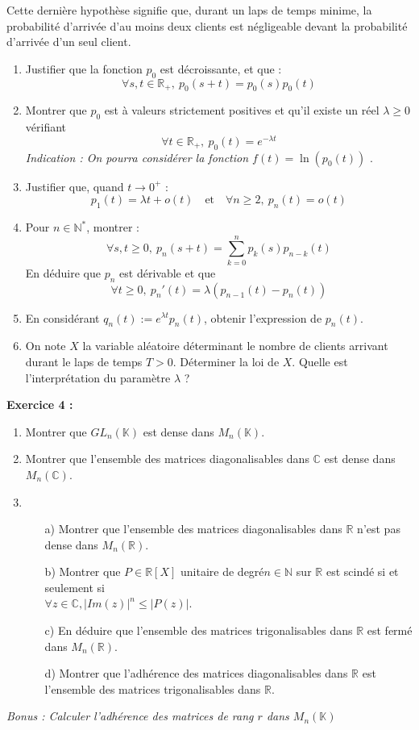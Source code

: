 \documentclass[11pt,a4paper]{article}
\begin{document}
Cette dernière hypothèse signifie que, durant un laps de temps minime, la probabilité d'arrivée d'au moins deux clients est négligeable devant la probabilité d'arrivée d'un seul client.

\begin{enumerate}
\item Justifier que la fonction $p_0$ est décroissante, et que : \[\forall s,t \in \mathbb{R}_+, \ p_0(s+t)=p_0(s)p_0(t)\]
\item Montrer que $p_0$ est à valeurs strictement positives et qu'il existe un réel $\lambda \geq 0$ vérifiant \[\forall t \in \mathbb{R}_+, \ p_0(t) = e^{-\lambda t}\]
\textit{Indication : On pourra considérer la fonction $f(t) = \ln{(p_0(t))}$ }.
\item Justifier que, quand  $t \to 0^+$ : \[p_1(t) = \lambda t + o(t) \ \ \  \text{ et } \ \ \ \forall n \geq 2, \ p_n(t) = o(t)\]
\item Pour $n\in \mathbb{N}^*$, montrer : \[\forall s,t \geq 0, \  p_n(s+t)= \sum_{k=0}^np_k(s)p_{n-k}(t)\] En déduire que $p_n$ est dérivable et que \[\forall t \geq 0, \ p_n'(t)=\lambda(p_{n-1}(t) - p_n(t))\]
\item En considérant $q_n(t) := e^{\lambda t} p_n(t)$, obtenir l'expression de $p_n(t)$.
\item On note $X$ la variable aléatoire déterminant le nombre de clients arrivant durant le laps de temps $T >0$. Déterminer la loi de $X$. Quelle est l'interprétation du paramètre $\lambda$ ? \\
\end{enumerate}

\textbf{Exercice 4 :}
\begin{enumerate}
\item Montrer que $GL_n(\mathbb{K})$ est dense dans $M_n(\mathbb{K})$.
\item Montrer que l'ensemble des matrices diagonalisables dans $\mathbb{C}$ est dense dans $M_n(\mathbb{C})$.
\item 
\begin{itemize}
\item[a)] Montrer que l’ensemble des matrices diagonalisables dans $\mathbb{R}$ n’est pas dense dans $M_n(\mathbb{R})$.
\item[b)] Montrer que $P\in \mathbb{R}[X]$ unitaire de degré$n\in \mathbb{N}$ sur $\mathbb{R}$ est scindé si et seulement si \\ $ \forall z \in \mathbb{C},|Im(z)|^n \leq |P(z)|$.
\item[c)] En déduire que l'ensemble des matrices trigonalisables dans $\mathbb{R}$ est fermé dans $M_n(\mathbb{R})$.
\item[d)]  Montrer que l’adhérence des matrices diagonalisables dans $\mathbb{R}$ est l’ensemble des matrices
trigonalisables dans $\mathbb{R}$.
\end{itemize}
\end{enumerate}
\textit{Bonus : Calculer l'adhérence des matrices de rang $r$ dans $M_n(\mathbb{K})$} \\
\end{document}

